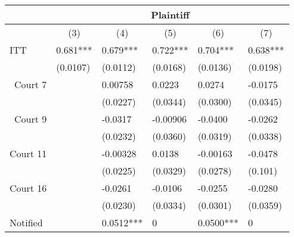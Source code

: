 \begin{tabular}{rrrrrr}
\toprule
      & \multicolumn{5}{c}{Plaintiff} \\
\midrule
      & \multicolumn{1}{c}{(3)} & \multicolumn{1}{c}{(4)} & \multicolumn{1}{c}{(5)} & \multicolumn{1}{c}{(6)} & \multicolumn{1}{c}{(7)} \\
\multicolumn{1}{l}{ITT} & \multicolumn{1}{l}{0.681***} & \multicolumn{1}{l}{0.679***} & \multicolumn{1}{l}{0.722***} & \multicolumn{1}{l}{0.704***} & \multicolumn{1}{l}{0.638***} \\
\multicolumn{1}{l}{} & \multicolumn{1}{l}{(0.0107)} & \multicolumn{1}{l}{(0.0112)} & \multicolumn{1}{l}{(0.0168)} & \multicolumn{1}{l}{(0.0136)} & \multicolumn{1}{l}{(0.0198)} \\
Court 7 & \multicolumn{1}{l}{} & \multicolumn{1}{l}{0.00758} & \multicolumn{1}{l}{0.0223} & \multicolumn{1}{l}{0.0274} & \multicolumn{1}{l}{-0.0175} \\
      & \multicolumn{1}{l}{} & \multicolumn{1}{l}{(0.0227)} & \multicolumn{1}{l}{(0.0344)} & \multicolumn{1}{l}{(0.0300)} & \multicolumn{1}{l}{(0.0345)} \\
Court 9 & \multicolumn{1}{l}{} & \multicolumn{1}{l}{-0.0317} & \multicolumn{1}{l}{-0.00906} & \multicolumn{1}{l}{-0.0400} & \multicolumn{1}{l}{-0.0262} \\
      & \multicolumn{1}{l}{} & \multicolumn{1}{l}{(0.0232)} & \multicolumn{1}{l}{(0.0360)} & \multicolumn{1}{l}{(0.0319)} & \multicolumn{1}{l}{(0.0338)} \\
Court 11 & \multicolumn{1}{l}{} & \multicolumn{1}{l}{-0.00328} & \multicolumn{1}{l}{0.0138} & \multicolumn{1}{l}{-0.00163} & \multicolumn{1}{l}{-0.0478} \\
      & \multicolumn{1}{l}{} & \multicolumn{1}{l}{(0.0225)} & \multicolumn{1}{l}{(0.0329)} & \multicolumn{1}{l}{(0.0278)} & \multicolumn{1}{l}{(0.101)} \\
Court 16 & \multicolumn{1}{l}{} & \multicolumn{1}{l}{-0.0261} & \multicolumn{1}{l}{-0.0106} & \multicolumn{1}{l}{-0.0255} & \multicolumn{1}{l}{-0.0280} \\
\multicolumn{1}{l}{} & \multicolumn{1}{l}{} & \multicolumn{1}{l}{(0.0230)} & \multicolumn{1}{l}{(0.0334)} & \multicolumn{1}{l}{(0.0301)} & \multicolumn{1}{l}{(0.0359)} \\
\multicolumn{1}{l}{Notified} & \multicolumn{1}{l}{} & \multicolumn{1}{l}{0.0512***} & \multicolumn{1}{l}{0} & \multicolumn{1}{l}{0.0500***} & \multicolumn{1}{l}{0} \\

\end{tabular}
